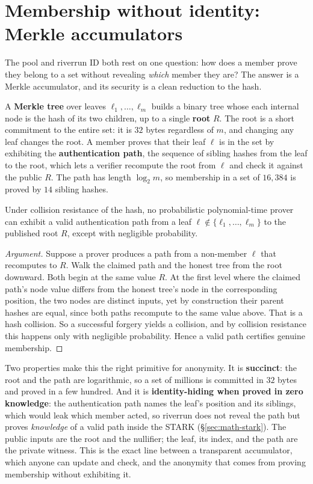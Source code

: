 \documentclass[11pt]{article}
\begin{document}
\section{Membership without identity: Merkle accumulators}
\label{sec:math-merkle}

The pool and riverrun ID both rest on one question: how does a member prove they belong
to a set without revealing \emph{which} member they are? The answer is a Merkle
accumulator, and its security is a clean reduction to the hash.

A \textbf{Merkle tree} over leaves $\ell_1, \dots, \ell_m$ builds a binary tree whose
each internal node is the hash of its two children, up to a single \textbf{root} $R$.
The root is a short commitment to the entire set: it is $32$ bytes regardless of $m$, and
changing any leaf changes the root. A member proves that their leaf $\ell$ is in the set
by exhibiting the \textbf{authentication path}, the sequence of sibling hashes from the
leaf to the root, which lets a verifier recompute the root from $\ell$ and check it
against the public $R$. The path has length $\log_2 m$, so membership in a set of
$16{,}384$ is proved by $14$ sibling hashes.

\begin{claimx}
Under collision resistance of the hash, no probabilistic polynomial-time prover can
exhibit a valid authentication path from a leaf $\ell \notin \{\ell_1, \dots, \ell_m\}$
to the published root $R$, except with negligible probability.
\end{claimx}

\begin{proof}[Argument]
Suppose a prover produces a path from a non-member $\ell$ that recomputes to $R$. Walk
the claimed path and the honest tree from the root downward. Both begin at the same value
$R$. At the first level where the claimed path's node value differs from the honest tree's
node in the corresponding position, the two nodes are distinct inputs, yet by construction
their parent hashes are equal, since both paths recompute to the same value above. That is
a hash collision. So a successful forgery yields a collision, and by collision resistance
this happens only with negligible probability. Hence a valid path certifies genuine
membership.
\end{proof}

Two properties make this the right primitive for anonymity. It is \textbf{succinct}: the
root and the path are logarithmic, so a set of millions is committed in $32$ bytes and
proved in a few hundred. And it is \textbf{identity-hiding when proved in zero knowledge}:
the authentication path names the leaf's position and its siblings, which would leak which
member acted, so riverrun does not reveal the path but proves \emph{knowledge} of a valid
path inside the STARK (\S\ref{sec:math-stark}). The public inputs are the root and the
nullifier; the leaf, its index, and the path are the private witness. This is the exact
line between a transparent accumulator, which anyone can update and check, and the
anonymity that comes from proving membership without exhibiting it.
\end{document}
